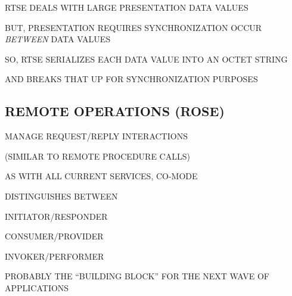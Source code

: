 

\begin{bwslide}

\begin{nrtc}
\item	RTSE DEALS WITH LARGE PRESENTATION DATA VALUES

\item	BUT, PRESENTATION REQUIRES SYNCHRONIZATION OCCUR \emph{BETWEEN} DATA
	VALUES

\item	SO, RTSE SERIALIZES EACH DATA VALUE INTO AN OCTET STRING
    \begin{nrtc}
    \item	AND BREAKS THAT UP FOR SYNCHRONIZATION PURPOSES
    \end{nrtc}
\end{nrtc}
\end{bwslide}


\begin{bwslide}
\part*	{REMOTE OPERATIONS (ROSE)}\bf

\begin{nrtc}
\item	MANAGE REQUEST/REPLY INTERACTIONS
    \begin{nrtc}
    \item	(SIMILAR TO REMOTE PROCEDURE CALLS)
    \end{nrtc}

\item	AS WITH ALL CURRENT SERVICES, CO-MODE

\item	DISTINGUISHES BETWEEN
    \begin{nrtc}
    \item	INITIATOR/RESPONDER

    \item	CONSUMER/PROVIDER

    \item	INVOKER/PERFORMER
    \end{nrtc}
\item	PROBABLY THE ``BUILDING BLOCK'' FOR THE NEXT WAVE OF APPLICATIONS
\end{nrtc}
\end{bwslide}


